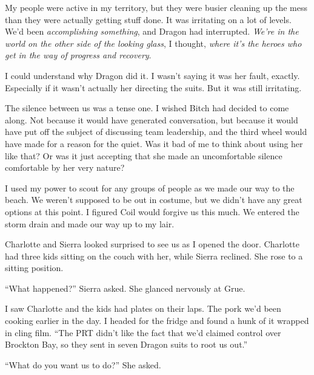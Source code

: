 \blacksquare



My people were active in my territory, but they were busier cleaning up the mess than they were actually getting stuff done.  It was irritating on a lot of levels.  We'd been \emph{accomplishing something}, and Dragon had interrupted.  \emph{We're in the world on the other side of the looking glass}, I thought, \emph{where it's the heroes who get in the way of progress and recovery}.



I could understand why Dragon did it.  I wasn't saying it was her fault, exactly.  Especially if it wasn't actually her directing the suits.  But it was still irritating.



The silence between us was a tense one.  I wished Bitch had decided to come along.  Not because it would have generated conversation, but because it would have put off the subject of discussing team leadership, and the third wheel would have made for a reason for the quiet.  Was it bad of me to think about using her like that?  Or was it just accepting that she made an uncomfortable silence comfortable by her very nature?



I used my power to scout for any groups of people as we made our way to the beach.  We weren't supposed to be out in costume, but we didn't have any great options at this point.  I figured Coil would forgive us this much.  We entered the storm drain and made our way up to my lair.



Charlotte and Sierra looked surprised to see us as I opened the door.  Charlotte had three kids sitting on the couch with her, while Sierra reclined.  She rose to a sitting position.



``What happened?'' Sierra asked.  She glanced nervously at Grue.



I saw Charlotte and the kids had plates on their laps.  The pork we'd been cooking earlier in the day.  I headed for the fridge and found a hunk of it wrapped in cling film.  ``The PRT didn't like the fact that we'd claimed control over Brockton Bay, so they sent in seven Dragon suits to root us out.''



``What do you want us to do?'' She asked.




